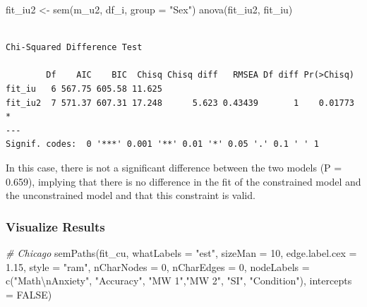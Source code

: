 \documentclass[
  letterpaper,
  DIV=11,
  numbers=noendperiod]{scrartcl}
\newenvironment{Shaded}{\begin{snugshade}}{\end{snugshade}}
\newcommand{\AttributeTok}[1]{\textcolor[rgb]{0.49,0.56,0.16}{#1}}
\newcommand{\CommentTok}[1]{\textcolor[rgb]{0.38,0.63,0.69}{\textit{#1}}}
\newcommand{\ConstantTok}[1]{\textcolor[rgb]{0.53,0.00,0.00}{#1}}
\newcommand{\DecValTok}[1]{\textcolor[rgb]{0.25,0.63,0.44}{#1}}
\newcommand{\FloatTok}[1]{\textcolor[rgb]{0.25,0.63,0.44}{#1}}
\newcommand{\FunctionTok}[1]{\textcolor[rgb]{0.02,0.16,0.49}{#1}}
\newcommand{\NormalTok}[1]{\textcolor[rgb]{0.00,0.44,0.13}{#1}}
\newcommand{\OtherTok}[1]{\textcolor[rgb]{0.00,0.44,0.13}{#1}}
\newcommand{\SpecialCharTok}[1]{\textcolor[rgb]{0.25,0.44,0.63}{#1}}
\newcommand{\StringTok}[1]{\textcolor[rgb]{0.25,0.44,0.63}{#1}}
\begin{document}
\begin{Shaded}
\begin{Highlighting}[]
\NormalTok{fit\_iu2 }\OtherTok{\textless{}{-}} \FunctionTok{sem}\NormalTok{(m\_u2, df\_i, }\AttributeTok{group =} \StringTok{"Sex"}\NormalTok{)}
\FunctionTok{anova}\NormalTok{(fit\_iu2, fit\_iu)}
\end{Highlighting}
\end{Shaded}

\begin{verbatim}

Chi-Squared Difference Test

        Df    AIC    BIC  Chisq Chisq diff   RMSEA Df diff Pr(>Chisq)  
fit_iu   6 567.75 605.58 11.625                                        
fit_iu2  7 571.37 607.31 17.248      5.623 0.43439       1    0.01773 *
---
Signif. codes:  0 '***' 0.001 '**' 0.01 '*' 0.05 '.' 0.1 ' ' 1
\end{verbatim}

In this case, there is not a significant difference between the two
models (P = 0.659), implying that there is no difference in the fit of
the constrained model and the unconstrained model and that this
constraint is valid.

\hypertarget{visualize-results-1}{%
\subsubsection{Visualize Results}\label{visualize-results-1}}

\begin{Shaded}
\begin{Highlighting}[]
\CommentTok{\# Chicago}
\FunctionTok{semPaths}\NormalTok{(fit\_cu,}
         \AttributeTok{whatLabels =} \StringTok{"est"}\NormalTok{,}
         \AttributeTok{sizeMan =} \DecValTok{10}\NormalTok{,}
         \AttributeTok{edge.label.cex =} \FloatTok{1.15}\NormalTok{,}
         \AttributeTok{style =} \StringTok{"ram"}\NormalTok{,}
         \AttributeTok{nCharNodes =} \DecValTok{0}\NormalTok{, }\AttributeTok{nCharEdges =} \DecValTok{0}\NormalTok{,}
         \AttributeTok{nodeLabels =} \FunctionTok{c}\NormalTok{(}\StringTok{"Math}\SpecialCharTok{\textbackslash{}n}\StringTok{Anxiety"}\NormalTok{, }\StringTok{"Accuracy"}\NormalTok{,}
                        \StringTok{"MW 1"}\NormalTok{,}\StringTok{"MW 2"}\NormalTok{, }\StringTok{"SI"}\NormalTok{, }\StringTok{"Condition"}\NormalTok{),}
         \AttributeTok{intercepts =} \ConstantTok{FALSE}\NormalTok{)}
\end{Highlighting}
\end{Shaded}
\end{document}
